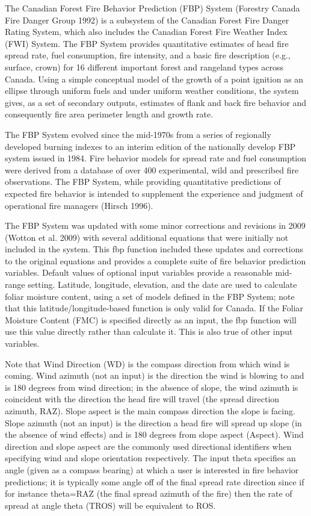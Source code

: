 \documentclass[a4paper]{book}
\begin{document}
\begin{Details}\relax
The Canadian Forest Fire Behavior Prediction (FBP) System (Forestry Canada
Fire Danger Group 1992) is a subsystem of the Canadian Forest Fire Danger
Rating System, which also includes the Canadian Forest Fire Weather Index
(FWI) System. The FBP System provides quantitative estimates of head fire
spread rate, fuel consumption, fire intensity, and a basic fire description
(e.g., surface, crown) for 16 different important forest and rangeland types
across Canada. Using a simple conceptual model of the growth of a point
ignition as an ellipse through uniform fuels and under uniform weather
conditions, the system gives, as a set of secondary outputs, estimates of
flank and back fire behavior and consequently fire area perimeter length and
growth rate.

The FBP System evolved since the mid-1970s from a series of regionally
developed burning indexes to an interim edition of the nationally develop
FBP system issued in 1984. Fire behavior models for spread rate and fuel
consumption were derived from a database of over 400 experimental, wild and
prescribed fire observations. The FBP System, while providing quantitative
predictions of expected fire behavior is intended to supplement the
experience and judgment of operational fire managers (Hirsch 1996).

The FBP System was updated with some minor corrections and revisions in 2009
(Wotton et al. 2009) with several additional equations that were initially
not included in the system. This fbp function included these updates and
corrections to the original equations and provides a complete suite of fire
behavior prediction variables. Default values of optional input variables
provide a reasonable mid-range setting. Latitude, longitude, elevation, and
the date are used to calculate foliar moisture content, using a set of
models defined in the FBP System; note that this latitude/longitude-based
function is only valid for Canada. If the Foliar Moisture Content (FMC) is
specified directly as an input, the fbp function will use this value
directly rather than calculate it. This is also true of other input
variables.

Note that Wind Direction (WD) is the compass direction from which wind is
coming. Wind azimuth (not an input) is the direction the wind is blowing to
and is 180 degrees from wind direction; in the absence of slope, the wind
azimuth is coincident with the direction the head fire will travel (the
spread direction azimuth, RAZ). Slope aspect is the main compass direction
the slope is facing. Slope azimuth (not an input) is the direction a head
fire will spread up slope (in the absence of wind effects) and is 180
degrees from slope aspect (Aspect).  Wind direction and slope aspect are the
commonly used directional identifiers when specifying wind and slope
orientation respectively.  The input theta specifies an angle (given as a
compass bearing) at which a user is interested in fire behavior predictions;
it is typically some angle off of the final spread rate direction since if
for instance theta=RAZ (the final spread azimuth of the fire) then the rate
of spread at angle theta (TROS) will be equivalent to ROS.
\end{Details}
\end{document}
